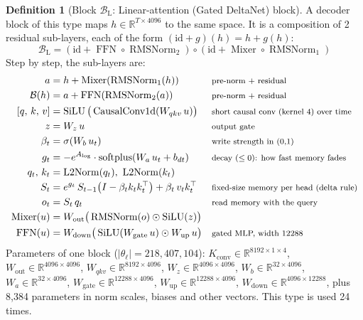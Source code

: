 \documentclass[10pt,a4paper]{article}
\newcommand{\op}[1]{\operatorname{#1}}
\theoremstyle{definition}
\newtheorem{definition}{Definition}[section]
\begin{document}
\begin{definition}[Block $\mathcal{B}_{\mathrm{L}}$: Linear-attention (Gated DeltaNet) block]
A decoder block of this type maps $h\in\mathbb{R}^{T\times 4096}$ to the same space. It is a composition of 2 residual sub-layers, each of the form $(\mathrm{id}+g)(h)=h+g(h)$:
\begin{equation}
  \mathcal{B}_{\mathrm{L}} = (\mathrm{id}+\op{FFN}\circ \op{RMSNorm}_{2})\circ(\mathrm{id}+\op{Mixer}\circ \op{RMSNorm}_{1})
\end{equation}
Step by step, the sub-layers are:
\begin{align*}
  a &= h + \op{Mixer}(\op{RMSNorm}_{1}(h)) && \text{\footnotesize pre-norm + residual} \\
  \mathcal{B}(h) &= a + \op{FFN}(\op{RMSNorm}_{2}(a)) && \text{\footnotesize pre-norm + residual} \\
  [q,\,k,\,v] &= \op{SiLU}\big(\op{CausalConv1d}(W_{qkv}\,u)\big) && \text{\footnotesize short causal conv (kernel 4) over time} \\
  z &= W_{z}\,u && \text{\footnotesize output gate} \\
  \beta_t &= \sigma(W_{b}\,u_t) && \text{\footnotesize write strength in (0,1)} \\
  g_t &= -e^{A_{\log}}\cdot\op{softplus}(W_{a}\,u_t + b_{dt}) && \text{\footnotesize decay ($\le 0$): how fast memory fades} \\
  q_t,\,k_t &= \op{L2Norm}(q_t),\ \op{L2Norm}(k_t) \\
  S_t &= e^{g_t}\,S_{t-1}\big(I - \beta_t k_t k_t^{\top}\big) + \beta_t\, v_t k_t^{\top} && \text{\footnotesize fixed-size memory per head (delta rule)} \\
  o_t &= S_t\, q_t && \text{\footnotesize read memory with the query} \\
  \op{Mixer}(u) &= W_{\mathrm{out}}\big(\op{RMSNorm}(o)\odot\op{SiLU}(z)\big) \\
  \op{FFN}(u) &= W_{\mathrm{down}}\big(\op{SiLU}(W_{\mathrm{gate}}\,u)\odot W_{\mathrm{up}}\,u\big) && \text{\footnotesize gated MLP, width 12288}
\end{align*}
Parameters of one block ($|\theta_\ell|=218{,}407{,}104$): $K_{\mathrm{conv}}\in\mathbb{R}^{8192\times1\times4}$, $W_{\mathrm{out}}\in\mathbb{R}^{4096\times4096}$, $W_{qkv}\in\mathbb{R}^{8192\times4096}$, $W_z\in\mathbb{R}^{4096\times4096}$, $W_b\in\mathbb{R}^{32\times4096}$, $W_a\in\mathbb{R}^{32\times4096}$, $W_{\mathrm{gate}}\in\mathbb{R}^{12288\times4096}$, $W_{\mathrm{up}}\in\mathbb{R}^{12288\times4096}$, $W_{\mathrm{down}}\in\mathbb{R}^{4096\times12288}$, plus 8,384 parameters in norm scales, biases and other vectors. This type is used 24 times.
\end{definition}
\end{document}
